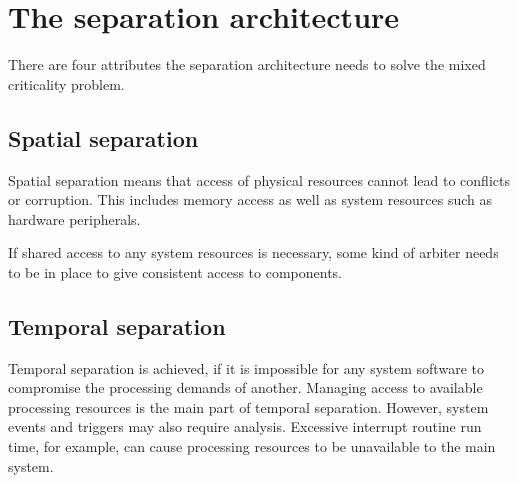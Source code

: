\section{The separation architecture}
There are four attributes the separation architecture needs to solve the mixed criticality problem.
\subsection{Spatial separation}

Spatial separation means that access of physical resources cannot lead to conflicts or corruption. This includes memory access as well as system resources such as hardware peripherals. 

If shared access to any system resources is necessary, some kind of arbiter needs to be in place to give consistent access to components. 
\subsection{Temporal separation}
Temporal separation is achieved, if it is impossible for any system software to compromise the processing demands of another.
Managing access to available processing resources is the main part of temporal separation. However, system events and triggers may also require analysis. Excessive interrupt routine run time, for example, can cause processing resources to be unavailable to the main system. 

